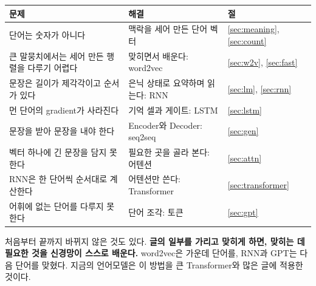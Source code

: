 \documentclass[11pt,a4paper]{article}
\begin{document}
\begin{center}
\begin{tabular}{@{}p{70mm}p{62mm}l@{}}
\toprule
문제 & 해결 & 절 \\
\midrule
단어는 숫자가 아니다 & 맥락을 세어 만든 단어 벡터 & \ref{sec:meaning}, \ref{sec:count} \\
큰 말뭉치에서는 세어 만든 행렬을 다루기 어렵다 & 맞히면서 배운다: word2vec & \ref{sec:w2v}, \ref{sec:fast} \\
문장은 길이가 제각각이고 순서가 있다 & 은닉 상태로 요약하며 읽는다: RNN & \ref{sec:lm}, \ref{sec:rnn} \\
먼 단어의 gradient가 사라진다 & 기억 셀과 게이트: LSTM & \ref{sec:lstm} \\
문장을 받아 문장을 내야 한다 & Encoder와 Decoder: seq2seq & \ref{sec:gen} \\
벡터 하나에 긴 문장을 담지 못한다 & 필요한 곳을 골라 본다: 어텐션 & \ref{sec:attn} \\
RNN은 한 단어씩 순서대로 계산한다 & 어텐션만 쓴다: Transformer & \ref{sec:transformer} \\
어휘에 없는 단어를 다루지 못한다 & 단어 조각: 토큰 & \ref{sec:gpt} \\
\bottomrule
\end{tabular}
\end{center}

처음부터 끝까지 바뀌지 않은 것도 있다. \textbf{글의 일부를 가리고 맞히게 하면, 맞히는 데 필요한 것을 신경망이 스스로 배운다.}
word2vec은 가운데 단어를, RNN과 GPT는 다음 단어를 맞혔다. 지금의 언어모델은 이 방법을 큰 Transformer와 많은 글에 적용한 것이다.
\end{document}
